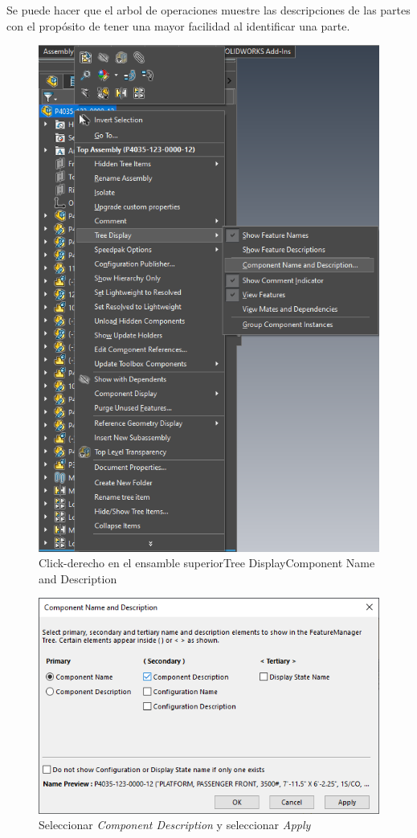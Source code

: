 \documentclass[12pt,letterpaper,final]{report}
\begin{document}
Se puede hacer que el arbol de operaciones muestre las descripciones de las partes con el propósito de tener una mayor facilidad al identificar una parte.

\begin{figure}[H]
	\centering
	\includegraphics[width=0.85\linewidth, height=0.5\textheight,keepaspectratio]{Imagenes/solidworks_treedisplay01}
	\caption{Click-derecho en el ensamble superior\textrightarrow Tree Display\textrightarrow Component Name and Description}
	\label{fig:solidworkstreedisplay01}
\end{figure}

\begin{figure}[H]
	\centering
	\includegraphics[width=0.85\linewidth, height=0.5\textheight,keepaspectratio]{Imagenes/solidworks_treedisplay02}
	\caption{Seleccionar \emph{Component Description} y seleccionar \emph{Apply}}
	\label{fig:solidworkstreedisplay02}
\end{figure}
\end{document}
